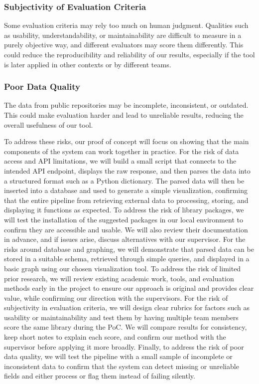 \documentclass{article}
\begin{document}
\subsubsection*{Subjectivity of Evaluation Criteria}\vspace{-0.5em}
Some evaluation criteria may rely too much on human judgment. Qualities such as usability, understandability, or maintainability are difficult to measure in a purely objective way, and different evaluators may score them differently. This could reduce the reproducibility and reliability of our results, especially if the tool is later applied in other contexts or by different teams.

\subsubsection*{Poor Data Quality}\vspace{-0.5em}
The data from public repositories may be incomplete, inconsistent, or outdated. This could make evaluation harder and lead to unreliable results, reducing the overall usefulness of our tool.

\vspace{1em} %
\noindent
To address these risks, our proof of concept will focus on showing that the main components of the system can work together in practice. For the risk of data access and API limitations, we will build a small script that connects to the intended API endpoint, displays the raw response, and then parses the data into a structured format such as a Python dictionary. The parsed data will then be inserted into a database and used to generate a simple visualization, confirming that the entire pipeline from retrieving external data to processing, storing, and displaying it functions as expected. To address the risk of library packages, we will test the installation of the suggested packages in our local environment to confirm they are accessible and usable. We will also review their documentation in advance, and if issues arise, discuss alternatives with our supervisor. For the risks around database and graphing, we will demonstrate that parsed data can be stored in a suitable schema, retrieved through simple queries, and displayed in a basic graph using our chosen visualization tool. To address the risk of limited prior research, we will review existing academic work, tools, and evaluation methods early in the project to ensure our approach is original and provides clear value, while confirming our direction with the supervisors. For the risk of subjectivity in evaluation criteria, we will design clear rubrics for factors such as usability or maintainability and test them by having multiple team members score the same library during the PoC. We will compare results for consistency, keep short notes to explain each score, and confirm our method with the supervisor before applying it more broadly. Finally, to address the risk of poor data quality, we will test the pipeline with a small sample of incomplete or inconsistent data to confirm that the system can detect missing or unreliable fields and either process or flag them instead of failing silently.
\end{document}
